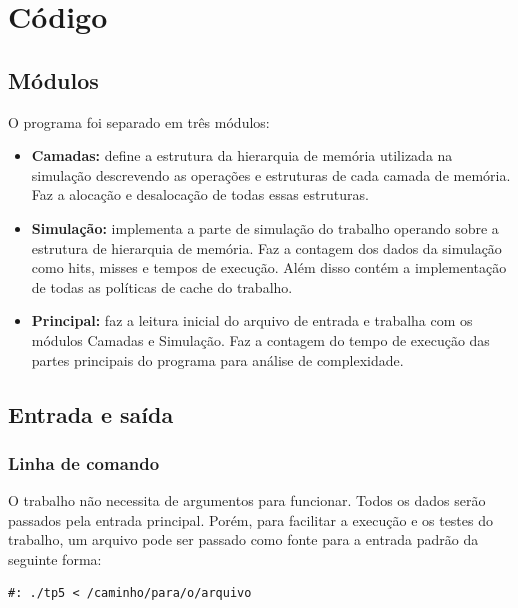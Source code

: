 \documentclass[12pt]{article}
\begin{document}
\section{Código}

\subsection{Módulos}
O programa foi separado em três módulos:
\begin{itemize}
\item \textbf{Camadas:} define a estrutura da hierarquia de memória utilizada na simulação descrevendo as operações e estruturas de cada camada de memória. Faz a alocação e desalocação de todas essas estruturas.
\item \textbf{Simulação:} implementa a parte de simulação do trabalho operando sobre a estrutura de hierarquia de memória. Faz a contagem dos dados da simulação como hits, misses e tempos de execução. Além disso contém a implementação de todas as políticas de cache do trabalho.
\item \textbf{Principal:} faz a leitura inicial do arquivo de entrada e trabalha com os módulos Camadas e Simulação. Faz a contagem do tempo de execução das partes principais do programa para análise de complexidade.
\end{itemize}

\subsection{Entrada e saída}
\subsubsection{Linha de comando}
O trabalho não necessita de argumentos para funcionar. Todos os dados serão passados pela entrada principal. Porém, para facilitar a execução e os testes do trabalho, um arquivo pode ser passado como fonte para a entrada padrão da seguinte forma:

\begin{verbatim}
#: ./tp5 < /caminho/para/o/arquivo
\end{verbatim}
\end{document}
